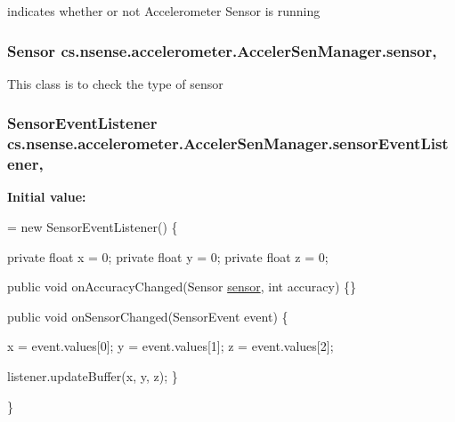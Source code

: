 indicates whether or not Accelerometer Sensor is running \hypertarget{classcs_1_1nsense_1_1accelerometer_1_1_acceler_sen_manager_a5f78f1b0c5d973a82f6c26d3980cbf96}{
\subsubsection[{sensor}]{\setlength{\rightskip}{0pt plus 5cm}Sensor cs.\-nsense.\-accelerometer.\-Acceler\-Sen\-Manager.\-sensor\hspace{0.3cm}{\ttfamily [static]}, {\ttfamily [private]}}}\label{classcs_1_1nsense_1_1accelerometer_1_1_acceler_sen_manager_a5f78f1b0c5d973a82f6c26d3980cbf96}
This class is to check the type of sensor \hypertarget{classcs_1_1nsense_1_1accelerometer_1_1_acceler_sen_manager_a2af5da27f9dc2f2ed4bf2ba1f55f1a77}{
\subsubsection[{sensor\-Event\-Listener}]{\setlength{\rightskip}{0pt plus 5cm}Sensor\-Event\-Listener cs.\-nsense.\-accelerometer.\-Acceler\-Sen\-Manager.\-sensor\-Event\-Listener\hspace{0.3cm}{\ttfamily [static]}, {\ttfamily [private]}}}\label{classcs_1_1nsense_1_1accelerometer_1_1_acceler_sen_manager_a2af5da27f9dc2f2ed4bf2ba1f55f1a77}
{\bfseries Initial value\-:}
\begin{DoxyCode}
=
            \textcolor{keyword}{new} SensorEventListener() \{

        \textcolor{keyword}{private} \textcolor{keywordtype}{float} x = 0;
        \textcolor{keyword}{private} \textcolor{keywordtype}{float} y = 0;
        \textcolor{keyword}{private} \textcolor{keywordtype}{float} z = 0;

        \textcolor{keyword}{public} \textcolor{keywordtype}{void} onAccuracyChanged(Sensor \hyperlink{classcs_1_1nsense_1_1accelerometer_1_1_acceler_sen_manager_a5f78f1b0c5d973a82f6c26d3980cbf96}{sensor}, \textcolor{keywordtype}{int} accuracy) \{\}

        \textcolor{keyword}{public} \textcolor{keywordtype}{void} onSensorChanged(SensorEvent event) \{

            x = event.values[0];
            y = event.values[1];
            z = event.values[2];

            listener.updateBuffer(x, y, z);
        \}

    \}
\end{DoxyCode}
